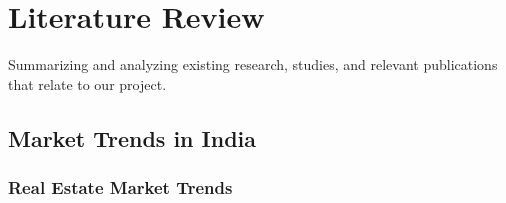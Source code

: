 
\chapter{Literature Review} %

\label{Chapter2} %

Summarizing and analyzing existing research, studies, and relevant
publications that relate to our project.

\section{Market Trends in India}
\subsection{Real Estate Market Trends}
